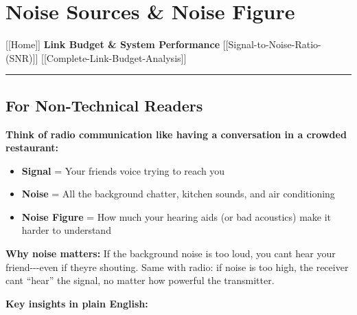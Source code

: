 \section{Noise Sources \& Noise
Figure}\label{noise-sources-noise-figure}

{[}{[}Home{]}{]} \textbar{} \textbf{Link Budget \& System Performance}
\textbar{} {[}{[}Signal-to-Noise-Ratio-(SNR){]}{]} \textbar{}
{[}{[}Complete-Link-Budget-Analysis{]}{]}

\begin{center}\rule{0.5\linewidth}{0.5pt}\end{center}

\subsection{\texorpdfstring{ For Non-Technical
Readers}{ For Non-Technical Readers}}\label{for-non-technical-readers}

\textbf{Think of radio communication like having a conversation in a
crowded restaurant:}

\begin{itemize}
\tightlist
\item
  \textbf{Signal} = Your friend\textquotesingle s voice trying to reach
  you
\item
  \textbf{Noise} = All the background chatter, kitchen sounds, and air
  conditioning
\item
  \textbf{Noise Figure} = How much your hearing aids (or bad acoustics)
  make it harder to understand
\end{itemize}

\textbf{Why noise matters:} If the background noise is too loud, you
can\textquotesingle t hear your friend-\/-\/-even if
they\textquotesingle re shouting. Same with radio: if noise is too high,
the receiver can\textquotesingle t ``hear'' the signal, no matter how
powerful the transmitter.

\textbf{Key insights in plain English:}

